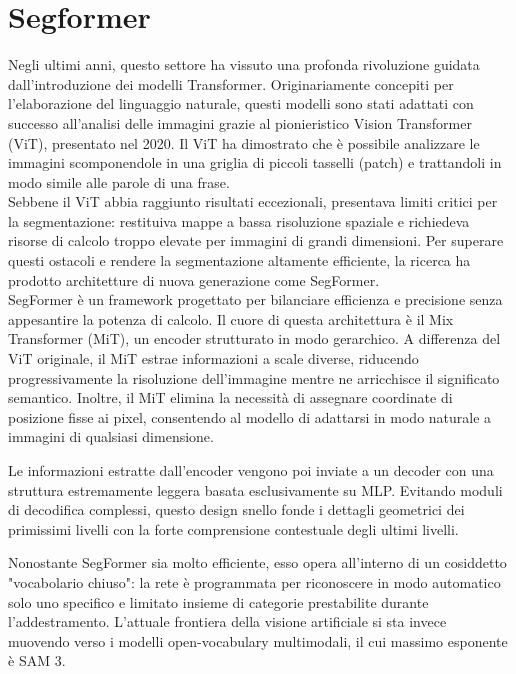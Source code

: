 \chapter{Segformer}

Negli ultimi anni, questo settore ha vissuto una profonda rivoluzione guidata dall'introduzione dei modelli Transformer. Originariamente concepiti per l'elaborazione del linguaggio naturale,
questi modelli sono stati adattati con successo all'analisi delle immagini grazie al pionieristico Vision Transformer (ViT), presentato nel 2020.
Il ViT ha dimostrato che è possibile analizzare le immagini scomponendole in una griglia di piccoli tasselli (patch) e trattandoli in modo simile alle parole di una frase. \cite{vit_2020} \\

\noindent
Sebbene il ViT abbia raggiunto risultati eccezionali, presentava limiti critici per la segmentazione: restituiva mappe a bassa risoluzione spaziale e richiedeva risorse di calcolo troppo elevate per immagini di grandi dimensioni.
Per superare questi ostacoli e rendere la segmentazione altamente efficiente, la ricerca ha prodotto architetture di nuova generazione come SegFormer. \cite{segformer_2021} \\

\noindent
SegFormer è un framework progettato per bilanciare efficienza e precisione senza appesantire la potenza di calcolo. Il cuore di questa architettura è il Mix Transformer (MiT),
un encoder strutturato in modo gerarchico. A differenza del ViT originale, il MiT estrae informazioni a scale diverse, riducendo progressivamente la risoluzione dell'immagine mentre ne arricchisce il significato semantico.
Inoltre, il MiT elimina la necessità di assegnare coordinate di posizione fisse ai pixel, consentendo al modello di adattarsi in modo naturale a immagini di qualsiasi dimensione.

Le informazioni estratte dall'encoder vengono poi inviate a un decoder con una struttura estremamente leggera basata esclusivamente su MLP. Evitando moduli di decodifica complessi,
questo design snello fonde i dettagli geometrici dei primissimi livelli con la forte comprensione contestuale degli ultimi livelli.

\newpage

\noindent
Nonostante SegFormer sia molto efficiente, esso opera all'interno di un cosiddetto "vocabolario chiuso": la rete è programmata per riconoscere in modo automatico solo uno specifico
e limitato insieme di categorie prestabilite durante l'addestramento. L'attuale frontiera della visione artificiale si sta invece muovendo verso i modelli open-vocabulary multimodali, il cui massimo esponente è SAM 3.

